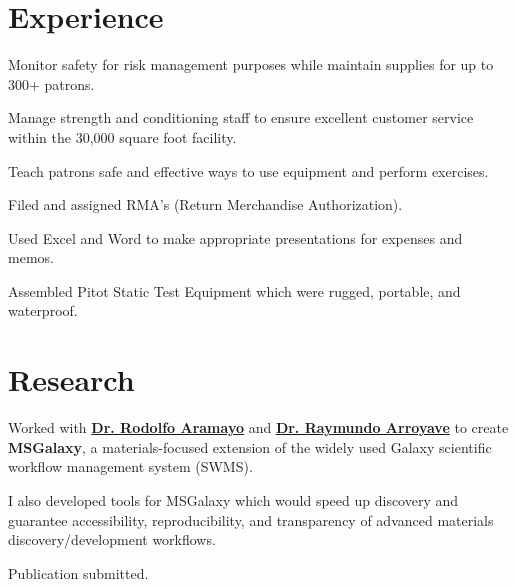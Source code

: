 \documentclass[]{vishrutrao-resume}
\begin{document}
\hfill
\begin{minipage}[t]{0.66\textwidth} 


\section{Experience}

\vspace{\topsep} %
\begin{tightemize}\item Monitor safety for risk management purposes while maintain supplies for
up to 300+ patrons. \item Manage strength and conditioning staff to ensure excellent customer
service within the 30,000 square foot facility. \item Teach patrons safe and effective ways to use equipment and perform exercises.
\end{tightemize}
\sectionsep

\begin{tightemize}
\item Filed and assigned RMA's (Return Merchandise Authorization).\item Used Excel and Word to make appropriate presentations for expenses and memos. \item Assembled Pitot Static Test Equipment which were rugged, portable, and waterproof. \end{tightemize}
\sectionsep


\section{Research}
\begin{tightemize}\item Worked with \textbf{\href{http://www.bio.tamu.edu/index.php/faculty/aramayo/}{Dr. Rodolfo Aramayo}} and \textbf{\href{https://sites.google.com/a/arroyavelab.net/wiki/}{Dr. Raymundo Arroyave}} to create \textbf{MSGalaxy}, a materials-focused extension of the widely used Galaxy scientific workflow management system (SWMS). \item I also developed tools for MSGalaxy which would speed up discovery and guarantee accessibility, reproducibility, and transparency of advanced materials discovery/development workflows. \item Publication submitted.
\end{tightemize}
\sectionsep


\end{minipage}
\end{document}
